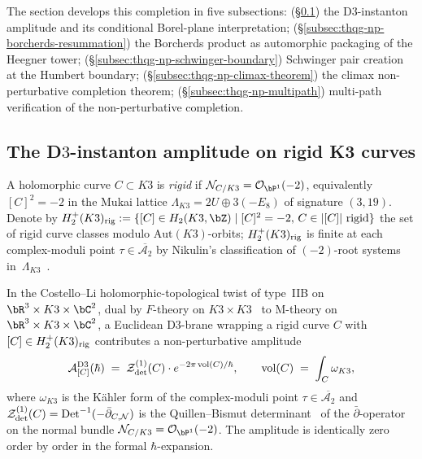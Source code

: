 The section develops this completion in five subsections:
(\S\ref{subsec:thqg-np-d3-instanton}) the D$3$-instanton amplitude and
its conditional Borel-plane interpretation;
(\S\ref{subsec:thqg-np-borcherds-resummation}) the Borcherds product
as automorphic packaging of the Heegner tower;
(\S\ref{subsec:thqg-np-schwinger-boundary}) Schwinger pair creation at
the Humbert boundary;
(\S\ref{subsec:thqg-np-climax-theorem}) the climax non-perturbative
completion theorem;
(\S\ref{subsec:thqg-np-multipath}) multi-path verification of the
non-perturbative completion.

\subsection{The D\texorpdfstring{$3$}{3}-instanton amplitude on rigid K3 curves}
\label{subsec:thqg-np-d3-instanton}

\begin{definition}
\label{def:thqg-np-rigid-curve}
A holomorphic curve $C\subset K3$ is \emph{rigid} if
$\mathcal{N}_{C/K3} = \mathcal{O}_{\bP^1}(-2)$, equivalently
$[C]^2 = -2$ in the Mukai lattice $\Lambda_{K3} = 2U\oplus 3(-E_8)$
of signature $(3, 19)$. Denote by
$H_2^+(K3)_{\rig} := \{[C]\in H_2(K3,\bZ)\mid [C]^2 = -2,\,C\in|[C]|\text{ rigid}\}$
the set of rigid curve classes modulo $\mathrm{Aut}(K3)$-orbits;
$H_2^+(K3)_{\mathrm{rig}}$ is finite at each complex-moduli point
$\tau\in\overline{\mathcal{A}_2}$ by Nikulin's classification of
$(-2)$-root systems
in~$\Lambda_{K3}$~\cite[Thm.~1.12.2]{Nikulin1980}.
\end{definition}

\begin{proposition}
\label{prop:thqg-np-d3-amplitude}
In the Costello--Li holomorphic-topological twist of type~IIB on
$\bR^3\times K3\times\bC^2$, dual by $F$-theory on
$K3\times K3$~\cite[\S 2]{VafaFTheory1996} to M-theory on
$\bR^3\times K3\times\bC^2$, a Euclidean D$3$-brane wrapping a rigid
curve $C$ with $[C]\in H_2^+(K3)_{\mathrm{rig}}$ contributes a
non-perturbative amplitude
\begin{equation}\label{eq:thqg-np-d3-amp}
 \mathcal{A}^{\mathrm{D3}}_{[C]}(\hbar)
 \;=\; \mathcal{Z}^{(1)}_{\det}(C)\cdot e^{-2\pi\operatorname{vol}(C)/\hbar},
 \qquad \operatorname{vol}(C) \;=\; \int_C\omega_{K3},
\end{equation}
where $\omega_{K3}$ is the K\"ahler form of the complex-moduli point
$\tau\in\overline{\mathcal{A}_2}$ and
$\mathcal{Z}^{(1)}_{\det}(C) = \operatorname{Det}^{-1}(-\bar\partial_{C,\mathcal{N}})$
is the Quillen--Bismut determinant~\cite[\S 7]{BismutGilletSoule1988}
of the $\bar\partial$-operator on the normal bundle
$\mathcal{N}_{C/K3} = \mathcal{O}_{\bP^1}(-2)$. The amplitude is
identically zero order by order in the formal $\hbar$-expansion.
\end{proposition}


